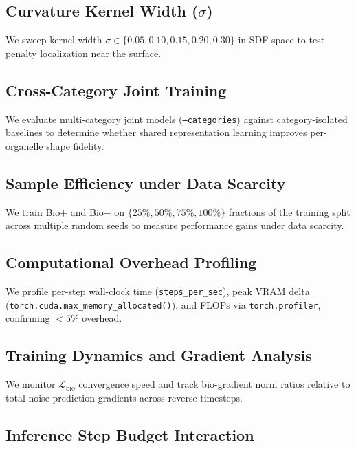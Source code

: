 \documentclass[10pt, a4paper, twocolumn]{article}
\begin{document}
\subsection{Curvature Kernel Width ($\sigma$)}
\label{sec:ablation_sigma}

We sweep kernel width $\sigma \in \{0.05, 0.10, 0.15, 0.20, 0.30\}$ in SDF space to test penalty localization near the surface.

\subsection{Cross-Category Joint Training}
\label{sec:ablation_joint}

We evaluate multi-category joint models (\texttt{--categories}) against category-isolated baselines to determine whether shared representation learning improves per-organelle shape fidelity.

\subsection{Sample Efficiency under Data Scarcity}
\label{sec:ablation_sample}

We train Bio$+$ and Bio$-$ on $\{25\%, 50\%, 75\%, 100\%\}$ fractions of the training split across multiple random seeds to measure performance gains under data scarcity.

\subsection{Computational Overhead Profiling}
\label{sec:ablation_cost}

We profile per-step wall-clock time (\texttt{steps\_per\_sec}), peak VRAM delta (\texttt{torch.cuda.max\_memory\_allocated()}), and FLOPs via \texttt{torch.profiler}, confirming $<5\%$ overhead.

\subsection{Training Dynamics and Gradient Analysis}
\label{sec:ablation_dynamics}

We monitor $\mathcal{L}_{\text{bio}}$ convergence speed and track bio-gradient norm ratios relative to total noise-prediction gradients across reverse timesteps.

\subsection{Inference Step Budget Interaction}
\label{sec:ablation_steps}
\end{document}
